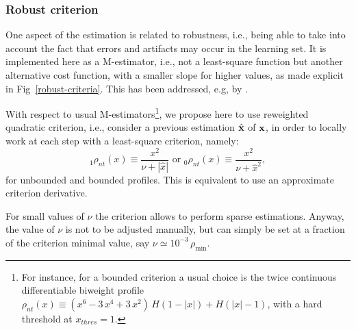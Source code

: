 \subsubsection*{Robust criterion} One aspect of the estimation is related to robustness, i.e., being able to take into account the fact that errors and artifacts may occur in the learning set. It is implemented here as a M-estimator, i.e., not  a least-square function but another alternative cost function, with a smaller slope for higher values, as made explicit in Fig~\ref{robust-criteria}. This has been addressed, e.g, by \cite{ChenJain1994}.

With respect to usual M-estimators\footnote{For instance, for a bounded criterion a usual choice is the twice continuous differentiable biweight profile $\rho_{nt}(x) \equiv (x^6 - 3 \, x^4 + 3 \, x^2) \, H(1 - |x|) + H(|x| - 1)$, with a hard threshold at $x_{thres} = 1$.}, we propose here to use reweighted quadratic criterion, i.e., consider a previous estimation $\hat{\bf x}$ of ${\bf x}$, in order to locally work at each step with a least-square criterion, namely:
\[
  {}_1\rho_{nt}(x) \equiv \frac{x^2}{\nu + |\hat{x}|} \mbox{ or } {}_0\rho_{nt}(x) \equiv \frac{x^2}{\nu + \hat{x}^2},
\]
for unbounded and bounded profiles. This is equivalent to use an approximate criterion derivative.

For small values of $\nu$ the criterion allows to perform sparse estimations. Anyway, the value of $\nu$ is not to be adjusted manually, but can simply be set at a fraction of the criterion minimal value, say $\nu \simeq 10^{-3} \, \rho_{\min}$. 

